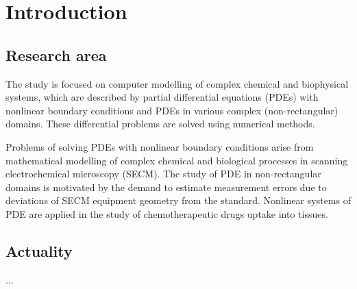 \chapter*{Introduction}
\label{cha:intro}

\section*{Research area}

The study is focused on computer modelling of complex chemical and biophysical systems, which are described by partial differential equations (PDEs) with nonlinear boundary conditions and PDEs in various complex (non-rectangular) domains. These differential problems are solved using numerical methods. 

Problems of solving PDEs with nonlinear boundary conditions arise from mathematical modelling of complex chemical and biological processes in scanning electrochemical microscopy (SECM). The study of PDE in non-rectangular domains is motivated by the demand to estimate measurement errors due to deviations of SECM equipment geometry from the standard. Nonlinear systems of PDE are applied in the study of chemotherapeutic drugs uptake into tissues.



\section*{Actuality}

...




